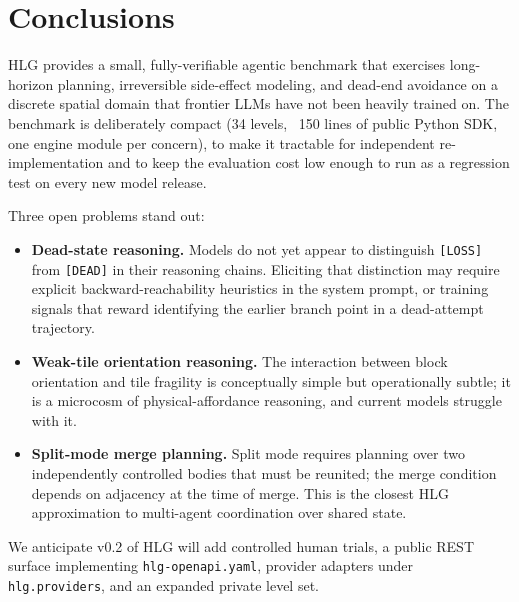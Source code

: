 \section{Conclusions}
\label{sec:conclusions}

HLG provides a small, fully-verifiable agentic benchmark that exercises long-horizon
planning, irreversible side-effect modeling, and dead-end avoidance on a discrete
spatial domain that frontier LLMs have not been heavily trained on. The benchmark is
deliberately compact (34 levels, ~150 lines of public Python SDK, one engine module per
concern), to make it tractable for independent re-implementation and to keep the
evaluation cost low enough to run as a regression test on every new model release.

Three open problems stand out:

\begin{itemize}[leftmargin=1.5em]
    \item \textbf{Dead-state reasoning.} Models do not yet appear to distinguish
      \texttt{[LOSS]} from \texttt{[DEAD]} in their reasoning chains. Eliciting that
      distinction may require explicit backward-reachability heuristics in the system
      prompt, or training signals that reward identifying the earlier branch point in a
      dead-attempt trajectory.
    \item \textbf{Weak-tile orientation reasoning.} The interaction between block
      orientation and tile fragility is conceptually simple but operationally subtle;
      it is a microcosm of physical-affordance reasoning, and current models struggle
      with it.
    \item \textbf{Split-mode merge planning.} Split mode requires planning over two
      independently controlled bodies that must be reunited; the merge condition
      depends on adjacency at the time of merge. This is the closest HLG approximation
      to multi-agent coordination over shared state.
\end{itemize}

We anticipate v0.2 of HLG will add controlled human trials, a public REST surface
implementing \texttt{hlg-openapi.yaml}, provider adapters under \texttt{hlg.providers},
and an expanded private level set.
